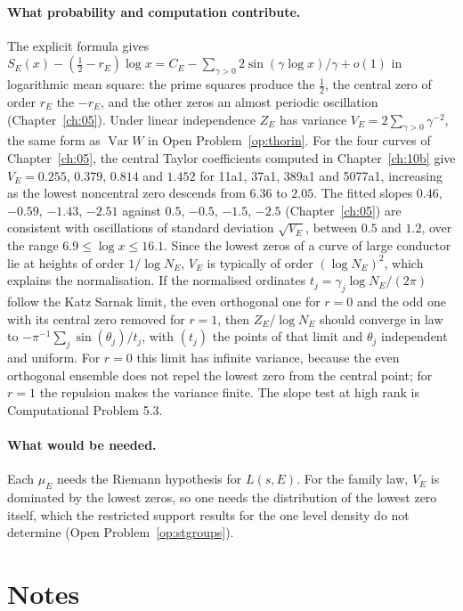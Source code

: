 \paragraph{What probability and computation contribute.} The explicit formula gives $S_E(x)-(\tfrac12-r_E)\log x=C_E-\sum_{\gamma>0}2\sin(\gamma\log x)/\gamma+o(1)$ in logarithmic mean square: the prime squares produce the $\tfrac12$, the central zero of order $r_E$ the $-r_E$, and the other zeros an almost periodic oscillation (Chapter~\ref{ch:05}). Under linear independence $Z_E$ has variance $V_E=2\sum_{\gamma>0}\gamma^{-2}$, the same form as $\operatorname{Var}W$ in Open Problem~\ref{op:thorin}. For the four curves of Chapter~\ref{ch:05}, the central Taylor coefficients computed in Chapter~\ref{ch:10b} give $V_E=0.255$, $0.379$, $0.814$ and $1.452$ for 11a1, 37a1, 389a1 and 5077a1, increasing as the lowest noncentral zero descends from $6.36$ to $2.05$. The fitted slopes $0.46$, $-0.59$, $-1.43$, $-2.51$ against $0.5$, $-0.5$, $-1.5$, $-2.5$ (Chapter~\ref{ch:05}) are consistent with oscillations of standard deviation $\sqrt{V_E}$, between $0.5$ and $1.2$, over the range $6.9\le\log x\le16.1$. Since the lowest zeros of a curve of large conductor lie at heights of order $1/\log N_E$, $V_E$ is typically of order $(\log N_E)^2$, which explains the normalisation. If the normalised ordinates $t_j=\gamma_j\log N_E/(2\pi)$ follow the Katz Sarnak limit, the even orthogonal one for $r=0$ and the odd one with its central zero removed for $r=1$, then $Z_E/\log N_E$ should converge in law to $-\pi^{-1}\sum_j\sin(\theta_j)/t_j$, with $(t_j)$ the points of that limit and $\theta_j$ independent and uniform. For $r=0$ this limit has infinite variance, because the even orthogonal ensemble does not repel the lowest zero from the central point; for $r=1$ the repulsion makes the variance finite. The slope test at high rank is Computational Problem 5.3.

\paragraph{What would be needed.} Each $\mu_E$ needs the Riemann hypothesis for $L(s,E)$. For the family law, $V_E$ is dominated by the lowest zeros, so one needs the distribution of the lowest zero itself, which the restricted support results for the one level density \cite{ils2000} do not determine (Open Problem~\ref{op:stgroups}).

\section{Notes}

